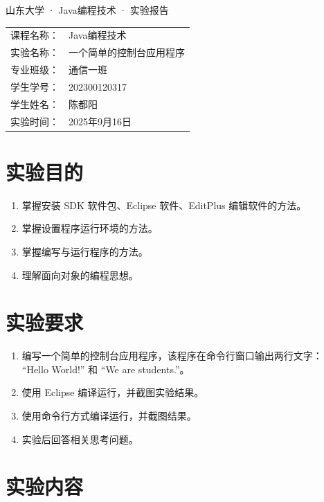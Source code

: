 \documentclass[12pt,a4paper]{article}
\begin{document}
\begin{center}
    \heiti{} 山东大学 · Java编程技术 · 实验报告 \\
    \vspace{1cm}
\end{center}

\begin{tabular}{rl}
    课程名称： & Java编程技术 \\
    实验名称： & 一个简单的控制台应用程序 \\
    专业班级： & 通信一班 \\
    学生学号： & 202300120317 \\
    学生姓名： & 陈都阳 \\
    实验时间： & 2025年9月16日 \\
\end{tabular}
\newpage
\vspace{1cm}

\section*{实验目的}
\begin{enumerate}
    \item 掌握安装 SDK 软件包、Eclipse 软件、EditPlus 编辑软件的方法。
    \item 掌握设置程序运行环境的方法。
    \item 掌握编写与运行程序的方法。
    \item 理解面向对象的编程思想。
\end{enumerate}

\section*{实验要求}
\begin{enumerate}
    \item 编写一个简单的控制台应用程序，该程序在命令行窗口输出两行文字：\\
    “Hello World!” 和 “We are students.”。
    \item 使用 Eclipse 编译运行，并截图实验结果。
    \item 使用命令行方式编译运行，并截图结果。
    \item 实验后回答相关思考问题。
\end{enumerate}

\section*{实验内容}
\end{document}
